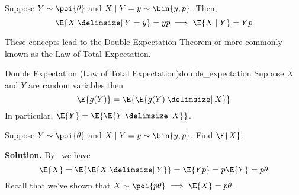 \begin{Example}{}{}
    Suppose $ Y \sim \poi{\theta} $ and $ X\mid Y=y \sim \bin{y,p} $. Then,
    \[ \E{X\given Y=y}=yp\implies \E{X\mid Y}=Yp \]
\end{Example}
These concepts lead to the Double Expectation Theorem
or more commonly known as the Law of Total Expectation.
\begin{Theorem}{Double Expectation (Law of Total Expectation)}{double_expectation}
    Suppose $ X $ and $ Y $ are random variables then
    \[ \E{g(Y)}=\E{\E{g(Y)\given X}} \]
    In particular, $ \E{Y}=\E{\E{Y\given X}} $.
\end{Theorem}
\begin{Example}{}{}
    Suppose $ Y \sim \poi{\theta} $ and $ X\mid Y=y \sim \bin{y,p} $. Find $ \E{X} $.

    \textbf{Solution.} By~ we have
    \[ \E{X}=\E{\E{X\given Y}}=\E{Yp}=p\E{Y}=p\theta \]
    Recall that we've shown that $ X \sim \poi{p\theta}\implies \E{X}=p\theta $.
\end{Example}
